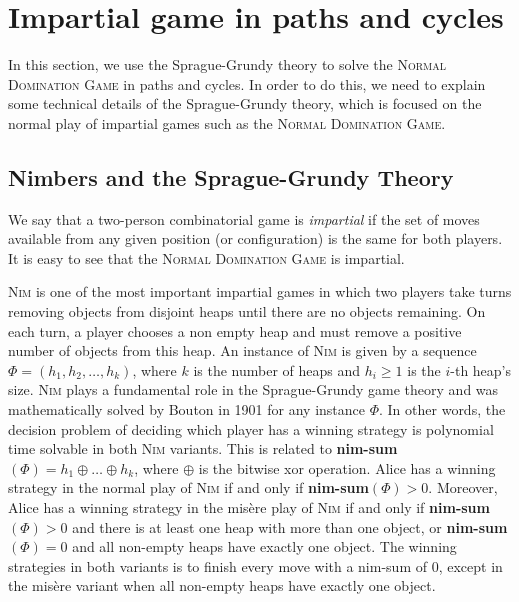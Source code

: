 \documentclass[12pt]{article}
\newcommand{\xor}{\oplus}
\begin{document}
\section{Impartial game in paths and cycles}\label{sec:path-cycle}

In this section, we use the Sprague-Grundy theory to solve the \textsc{Normal Domination Game} in paths and cycles.
In order to do this, we need to explain some technical details of the Sprague-Grundy theory, which is focused on the normal play of impartial games such as the \textsc{Normal Domination Game}.


\subsection{Nimbers and the Sprague-Grundy Theory}\label{sec:nimbers}

We say that a two-person combinatorial game is \emph{impartial} if the set of moves available from any given position (or configuration) is the same for both players.
It is easy to see that the \textsc{Normal Domination Game} is impartial.

\textsc{Nim} is one of the most important impartial games in which two players take turns removing objects from disjoint heaps until there are no objects remaining.
On each turn, a player chooses a non empty heap and must remove a positive number of objects from this heap.
An instance of \textsc{Nim} is given by a sequence $\Phi=(h_1,h_2,\ldots,h_k)$, where $k$ is the number of heaps and $h_i\geq 1$ is the $i$-th heap's size.
\textsc{Nim} plays a fundamental role in the Sprague-Grundy game theory and was mathematically solved \cite{nim1901} by Bouton in 1901 for any instance $\Phi$. In other words, the decision problem of deciding which player has a winning strategy is polynomial time solvable in both \textsc{Nim} variants.
This is related to \textbf{nim-sum}$(\Phi)=h_1\xor\ldots\xor h_k$, where $\xor$ is the bitwise xor operation.
Alice has a winning strategy in the normal play of \textsc{Nim} if and only if \textbf{nim-sum}$(\Phi)>0$. Moreover, Alice has a winning strategy in the misère play of \textsc{Nim} if and only if \textbf{nim-sum}$(\Phi)>0$ and there is at least one heap with more than one object, or \textbf{nim-sum}$(\Phi)=0$ and all non-empty heaps have exactly one object.
The winning strategies in both variants is to finish every move with a nim-sum of 0, except in the misère variant when all non-empty heaps have exactly one object.
\end{document}
